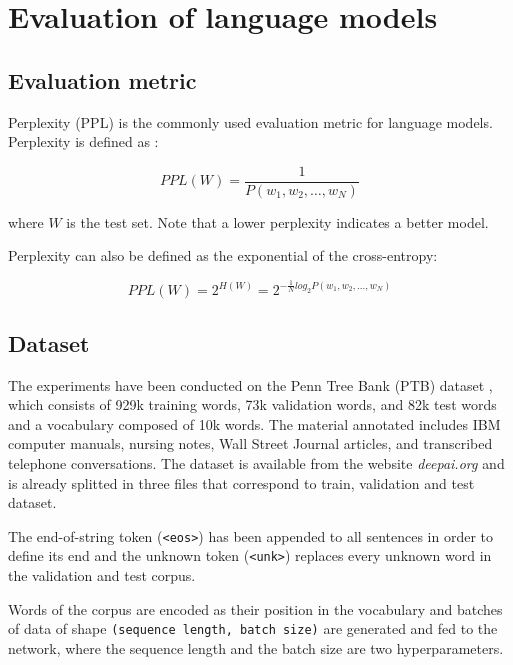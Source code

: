 
\section{Evaluation of language models}

\subsection{Evaluation metric}

Perplexity (PPL) is the commonly used evaluation metric for language models. 
Perplexity is defined as \cite{PPL}:

\begin{equation}
    PPL(W) = \frac{1}{P(w_1, w_2, \dots, w_N)}
\end{equation}

where $W$ is the test set. Note that a lower perplexity indicates a better model.

Perplexity can also be defined as the exponential of the cross-entropy:

\begin{equation}
    PPL(W) = 2^{H(W)} = 2^{-\frac{1}{N} log_2 P(w_1, w_2, \dots, w_N)}
\end{equation}


\subsection{Dataset}

The experiments have been conducted on the Penn Tree Bank (PTB) dataset 
\cite{PTB}, 
which consists of 929k training words, 73k validation words, and 82k test 
words and a vocabulary composed of 10k words. The material annotated includes 
IBM computer manuals, nursing notes, Wall Street Journal articles, and 
transcribed telephone conversations. The dataset is available from the website 
\textit{deepai.org} \cite{PTB_download} and is already splitted in three files
that correspond to train, validation and test dataset.

The end-of-string token (\texttt{<eos>}) has been appended to all sentences in 
order to define its end and the unknown token (\texttt{<unk>}) replaces 
every unknown word in the validation and test corpus.

Words of the corpus are encoded as their position in the vocabulary and batches
of data of shape \texttt{(sequence length, batch size)} are generated and fed to the network, 
where the sequence length and the batch size are two hyperparameters.
